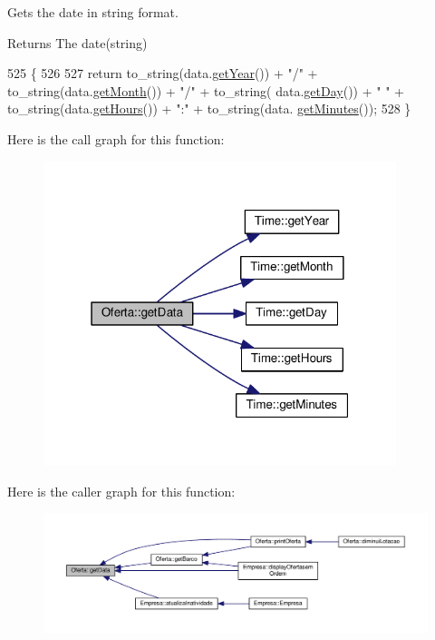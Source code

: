 Gets the date in string format. 

\begin{DoxyReturn}{Returns}
The date(string) 
\end{DoxyReturn}

\begin{DoxyCode}
525                        \{
526 
527     \textcolor{keywordflow}{return} to\_string(data.\hyperlink{classTime_ade4d01d38041bb86a2e1ded9fd3cd28e}{getYear}()) + \textcolor{stringliteral}{"/"} + to\_string(data.\hyperlink{classTime_a22fd86b14d3b067cf1447fd9ca5caf6f}{getMonth}()) + \textcolor{stringliteral}{"/"} + to\_string(
      data.\hyperlink{classTime_abdccc37217b520155a67a1d732014f1a}{getDay}()) + \textcolor{stringliteral}{" "} + to\_string(data.\hyperlink{classTime_ac38ba7bbc9876d7d75c6fb16ba7ac453}{getHours}()) + \textcolor{stringliteral}{":"} + to\_string(data.
      \hyperlink{classTime_a800d91da444cd295a329925c45942359}{getMinutes}());
528 \}
\end{DoxyCode}


Here is the call graph for this function\+:
\nopagebreak
\begin{figure}[H]
\begin{center}
\leavevmode
\includegraphics[width=292pt]{classOferta_a2b156b75371ad59af54ad96ad79c9d1e_cgraph}
\end{center}
\end{figure}




Here is the caller graph for this function\+:
\nopagebreak
\begin{figure}[H]
\begin{center}
\leavevmode
\includegraphics[width=350pt]{classOferta_a2b156b75371ad59af54ad96ad79c9d1e_icgraph}
\end{center}
\end{figure}


